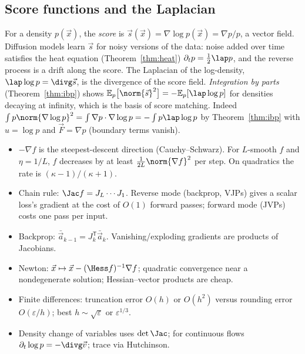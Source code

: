 \subsection{Score functions and the Laplacian}

For a density $p(\vec x)$, the \emph{score} is $\vec s(\vec x)=\nabla\log p(\vec x)=\nabla p/p$, a vector field. Diffusion models learn $\vec s$ for noisy versions of the data: noise added over time satisfies the heat equation (Theorem~\ref{thm:heat}) $\partial_tp=\frac12\lap p$, and the reverse process is a drift along the score. The Laplacian of the log-density, $\lap\log p=\divg\vec s$, is the divergence of the score field. \emph{Integration by parts} (Theorem~\ref{thm:ibp}) shows $\mathbb E_p\bigl[\norm{\vec s}^2\bigr]=-\mathbb E_p[\lap\log p]$ for densities decaying at infinity, which is the basis of score matching. Indeed $\int p\norm{\nabla\log p}^2=\int\nabla p\cdot\nabla\log p=-\int p\lap\log p$ by Theorem~\ref{thm:ibp} with $u=\log p$ and $\vec F=\nabla p$ (boundary terms vanish).

\begin{summarybox}
\begin{itemize}
  \item $-\nabla f$ is the steepest-descent direction (Cauchy--Schwarz). For $L$-smooth $f$ and $\eta=1/L$, $f$ decreases by at least $\frac1{2L}\norm{\nabla f}^2$ per step. On quadratics the rate is $(\kappa-1)/(\kappa+1)$.
  \item Chain rule: $\Jac f=J_L\cdots J_1$. Reverse mode (backprop, VJPs) gives a scalar loss's gradient at the cost of $O(1)$ forward passes; forward mode (JVPs) costs one pass per input.
  \item Backprop: $\bar{\vec a}_{k-1}=J_k^{\mathsf T}\bar{\vec a}_k$. Vanishing/exploding gradients are products of Jacobians.
  \item Newton: $\vec x\mapsto\vec x-(\Hess f)^{-1}\nabla f$; quadratic convergence near a nondegenerate solution; Hessian--vector products are cheap.
  \item Finite differences: truncation error $O(h)$ or $O(h^2)$ versus rounding error $O(\varepsilon/h)$; best $h\sim\sqrt\varepsilon$ or $\varepsilon^{1/3}$.
  \item Density change of variables uses $\det\Jac$; for continuous flows $\partial_t\log p=-\divg\vec v$; trace via Hutchinson.
\end{itemize}
\end{summarybox}

